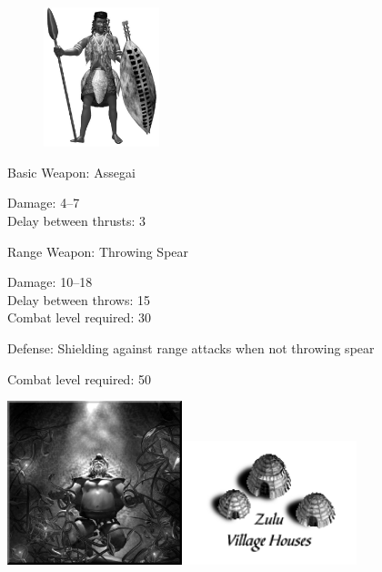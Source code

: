 \begin{figure}
	\begin{center}
		\vspace{-20pt}
		\includegraphics[width=0.3\textwidth]{Azulu}
	\end{center}
	\vspace{-20pt}
\end{figure}

Basic Weapon: Assegai
\begin{changemargin}{.5cm}{0cm}
	Damage: 4–7 \\
	Delay between thrusts: 3
\end{changemargin}
Range Weapon: Throwing Spear
\begin{changemargin}{.5cm}{0cm}
	Damage: 10–18 \\
	Delay between throws: 15 \\
	Combat level required: 30
\end{changemargin}
Defense: Shielding against range attacks when not throwing spear
\begin{changemargin}{.5cm}{0cm}
	Combat level required: 50
\end{changemargin}

\begin{center}
	\includegraphics[width=2in]{Aoldone}\hspace{1pt}\includegraphics[width=2in]{Izuluhouse}
\end{center}